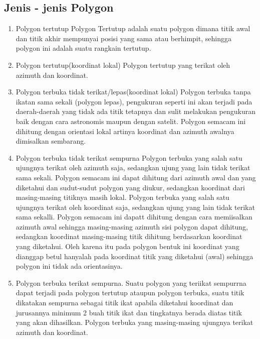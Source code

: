 \subsection{Jenis - jenis Polygon}
\begin{enumerate}
\item Polygon tertutup
  Polygon Tertutup adalah suatu polygon dimana titik awal dan titik akhir mempunyai posisi yang sama atau berhimpit, sehingga polygon ini adalah suatu rangkain tertutup.
\item Polygon tertutup(koordinat lokal)
  Polygon tertutup yang terikat oleh azimuth dan koordinat.
\item Polygon terbuka tidak terikat/lepas(koordinat lokal)
  Polygon terbuka tanpa ikatan sama sekali (polygon lepas), pengukuran seperti ini akan terjadi pada daerah-daerah yang tidak ada titik tetapnya dan sulit melakukan pengukuran baik dengan cara astronomis maupun dengan satelit. Polygon semacam ini dihitung dengan orientasi lokal artinya koordinat dan azimuth awalnya dimisalkan sembarang.
\item Polygon terbuka tidak terikat sempurna
  Polygon terbuka yang salah satu ujungnya terikat oleh azimuth saja, sedangkan ujung yang lain tidak terikat sama sekali. Polygon semacam ini dapat dihitung dari azimuth awal dan yang diketahui dan sudut-sudut polygon yang diukur, sedangkan koordinat dari masing-masing titiknya masih lokal. Polygon terbuka yang salah satu ujungnya terikat oleh koordinat saja, sedangkan ujung yang lain tidak terikat sama sekalli. Polygon semacam ini dapatt dihitung dengan cara memiisalkan azimuth awal sehingga masing-masing azimuth sisi polygon dapat dihitung, sedangkan koordinat masing-masing titik dihitung berdasarkan koordinat yang diketahui. Oleh karena itu pada polygon bentuk ini koordinat yang dianggap betul hanyalah pada koordinat titik yang diketahui (awal) sehingga polygon ini tidak ada orientasinya.
\item Polygon terbuka terikat sempurna.
  Suatu polygon yang teriikat sempurrna dapat terjadi pada polygon tertutup ataupun polygon terbuka, suatu titik dikatakan sempurna sebagai titik ikat apabila diketahui koordinat dan jurusannya minimum 2 buah titik ikat dan tingkatnya berada diatas titik yang akan dihasilkan. Polygon terbuka yang masing-masing ujungnya terikat azimuth dan koordinat.
\end{enumerate}

